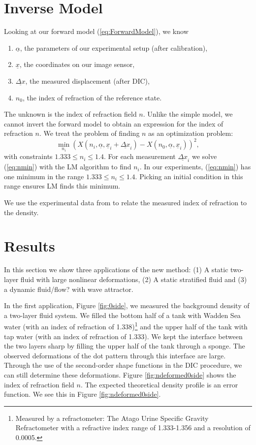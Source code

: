 \documentclass{svjour3}                     %
\begin{document}
\section{Inverse Model}
\label{sec:invmod}
Looking at our forward model (\ref{eq:ForwardModel}), we know
\begin{enumerate}
	\item $\underline{\alpha}$, the parameters of our experimental setup (after calibration), 
	\item $\underline{x}$, the coordinates on our image sensor, 
	\item $\underline{\Delta x}$, the measured displacement (after DIC), 
	\item $n_0$, the index of refraction of the reference state.
\end{enumerate}
The unknown is the index of refraction field $n$. Unlike the simple model, we cannot invert the forward model to obtain an expression for the index of refraction $n$. We treat the problem of finding $n$ as an optimization problem:
\begin{equation}
\label{eq:nmin} 
	\min_{n_i} (X(n_i, \underline{\alpha}, \underline{x}_i+\underline{\Delta x}_i) - X(n_0, \underline{\alpha}, \underline{x}_i))^2, 
\end{equation}
with constraints $1.333 \leq n_i \leq 1.4$. For each measurement $\underline{\Delta x}_i$ we solve (\ref{eq:nmin}) with the LM algorithm to find $n_i$. In our experiments, (\ref{eq:nmin}) has one minimum in the range $1.333 \leq n_i \leq 1.4$. Picking an initial condition in this range ensures LM finds this minimum.

We use the experimental data from \cite{tan2015dependence} to relate the measured index of refraction to the density.

\section{Results}
\label{sec:res}
In this section we show three applications of the new method: (1) A static two-layer fluid with large nonlinear deformations, (2) A static stratified fluid and (3) a dynamic fluid/flow? with wave attractor.

In the first application, Figure \ref{fig:0side}, we measured the background density of a two-layer fluid system. We filled the bottom half of a tank with Wadden Sea water (with an index of refraction of 1.338)\footnote{Measured by a refractometer: The Atago Urine Specific Gravity Refractometer with a refractive index range of 1.333-1.356 and a resolution of 0.0005.} and the upper half of the tank with tap water (with an index of refraction of 1.333). We kept the interface between the two layers sharp by filling the upper half of the tank through a sponge. The observed deformations of the dot pattern through this interface are large. Through the use of the second-order shape functions in the DIC procedure, we can still determine these deformations. Figure \ref{fig:ndeformed0side} shows the index of refraction field $n$. The expected theoretical density profile is an error function. We see this in Figure \ref{fig:ndeformed0side}.
\end{document}
